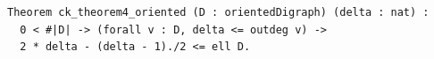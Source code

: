 \begin{lstlisting}[language=Rocq]
Theorem ck_theorem4_oriented (D : orientedDigraph) (delta : nat) :
  0 < #|D| -> (forall v : D, delta <= outdeg v) ->
  2 * delta - (delta - 1)./2 <= ell D.
\end{lstlisting}
